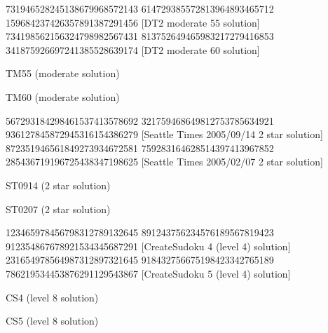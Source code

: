 \documentclass[twoside]{article}
\begin{document}
\renewcommand*{\puzzlefile}{tm55.ans}
\writepuzzle%
{731946528}{245138679}{968572143}%
{614729385}{572813964}{893465712}%
{159684237}{426357891}{387291456}%
[DT2 moderate 55 solution]
\renewcommand*{\puzzlefile}{tm60.ans}
\writepuzzle%
{734198562}{156324798}{982567431}%
{813752649}{465983217}{279416853}%
{341875926}{697241385}{528639174}%
[DT2 moderate 60 solution]
\vfill
\noindent\begin{minipage}{0.47\linewidth}\begin{center}
TM55 (moderate solution) \\
\end{center}\end{minipage}
\hfill
\begin{minipage}{0.47\linewidth}\begin{center}
TM60 (moderate solution) \\
\end{center}\end{minipage}

\renewcommand*{\puzzlefile}{st0914.ans}
\writepuzzle%
{567293184}{298461537}{413578692}%
{321759468}{649812753}{785634921}%
{936127845}{872945316}{154386279}%
[Seattle Times 2005/09/14 2 star solution]
\renewcommand*{\puzzlefile}{st0207.ans}
\writepuzzle%
{872351946}{561849273}{934672581}%
{759283164}{628514397}{413967852}%
{285436719}{196725438}{347198625}%
[Seattle Times 2005/02/07 2 star solution]
\vfill
\noindent\begin{minipage}{0.47\linewidth}\begin{center}
ST0914 (2 star solution) \\
\end{center}\end{minipage}
\hfill
\begin{minipage}{0.47\linewidth}\begin{center}
ST0207 (2 star solution) \\
\end{center}\end{minipage}

\renewcommand*{\puzzlefile}{cs4.ans}
\writepuzzle%
{123465978}{456798312}{789132645}%
{891243756}{234576189}{567819423}%
{912354867}{678921534}{345687291}%
[CreateSudoku 4 (level 4) solution]
\renewcommand*{\puzzlefile}{cs5.ans}
\writepuzzle%
{231654978}{564987312}{897321645}%
{918432756}{675198423}{342765189}%
{786219534}{453876291}{129543867}%
[CreateSudoku 5 (level 4) solution]
\vfill
\noindent\begin{minipage}{0.47\linewidth}\begin{center}
CS4 (level 8 solution) \\
\end{center}\end{minipage}
\hfill
\begin{minipage}{0.47\linewidth}\begin{center}
CS5 (level 8 solution) \\
\end{center}\end{minipage}
\end{document}
